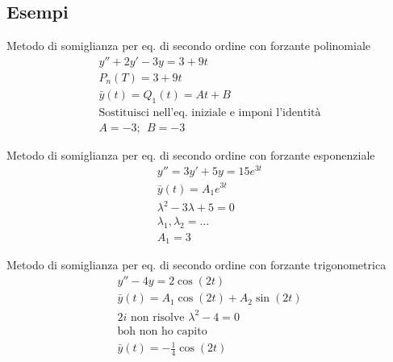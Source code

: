\subsection{Esempi}
\begin{esempio}
    Metodo di somiglianza per eq. di secondo ordine con forzante polinomiale
    \begin{gather*}
        y''+2y'-3y=3+9t \\
        P_n(T)=3+9t \\
        \bar{y}(t)=Q_1(t)=At+B \\
        \text{Sostituisci nell'eq. iniziale e imponi l'identità}\\
        A=-3;\ \ B=-3
    \end{gather*}
\end{esempio}
\begin{esempio}
    Metodo di somiglianza per eq. di secondo ordine con forzante esponenziale
    \begin{gather*}
        y''=3y'+5y=15e^{3t} \\
        \bar{y}(t)=A_1e^{3t} \\
        \lambda^{2}-3 \lambda +5=0 \\
        \lambda_1, \lambda_2 = ... \\
        A_1 = 3
    \end{gather*}
\end{esempio}
\begin{esempio}
    Metodo di somiglianza per eq. di secondo ordine con forzante trigonometrica
    \begin{gather*}
        y''-4y=2\cos(2t) \\
        \bar{y}(t)=A_1\cos(2t)+A_2\sin(2t) \\
        2i \text{ non risolve } \lambda^2-4=0 \\
        \text{boh non ho capito} \\
        \bar{y}(t)=- \frac14\cos(2t)
    \end{gather*}
\end{esempio}

